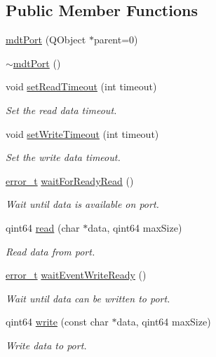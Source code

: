 \subsection*{Public Member Functions}
\begin{DoxyCompactItemize}
\item 
\hyperlink{classmdt_port_ac466eac9d1a54ea0e04c998660ad75ec}{mdt\-Port} (Q\-Object $\ast$parent=0)
\item 
\hyperlink{classmdt_port_aa19f56493000459083df371be57f67aa}{$\sim$mdt\-Port} ()
\item 
void \hyperlink{classmdt_port_aa77b266f23744f1b53ae589f986be101}{set\-Read\-Timeout} (int timeout)
\begin{DoxyCompactList}\small\item\em Set the read data timeout. \end{DoxyCompactList}\item 
void \hyperlink{classmdt_port_a2acb6e7bedacdadf78ee735dc611abfa}{set\-Write\-Timeout} (int timeout)
\begin{DoxyCompactList}\small\item\em Set the write data timeout. \end{DoxyCompactList}\item 
\hyperlink{classmdt_abstract_port_ad4121bb930c95887e77f8bafa065a85e}{error\-\_\-t} \hyperlink{classmdt_port_a84594fdb56cd455a366c69b0a9228020}{wait\-For\-Ready\-Read} ()
\begin{DoxyCompactList}\small\item\em Wait until data is available on port. \end{DoxyCompactList}\item 
qint64 \hyperlink{classmdt_port_ad8a196bb21b6ca76dffb068a1692904a}{read} (char $\ast$data, qint64 max\-Size)
\begin{DoxyCompactList}\small\item\em Read data from port. \end{DoxyCompactList}\item 
\hyperlink{classmdt_abstract_port_ad4121bb930c95887e77f8bafa065a85e}{error\-\_\-t} \hyperlink{classmdt_port_a85e77a391f6f5782428beb2e6aee52f8}{wait\-Event\-Write\-Ready} ()
\begin{DoxyCompactList}\small\item\em Wait until data can be written to port. \end{DoxyCompactList}\item 
qint64 \hyperlink{classmdt_port_a62f4a6f2c547d40d3743ce893e0f64d6}{write} (const char $\ast$data, qint64 max\-Size)
\begin{DoxyCompactList}\small\item\em Write data to port. \end{DoxyCompactList}\end{DoxyCompactItemize}
